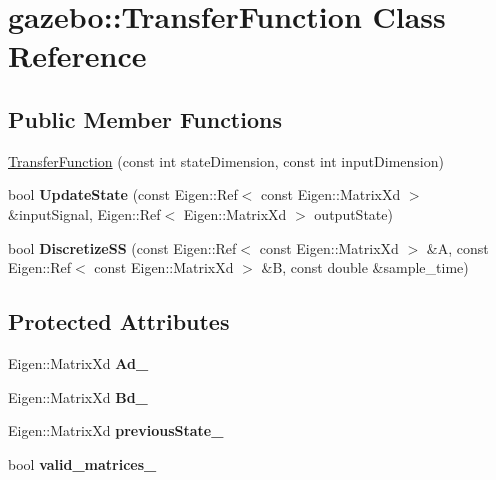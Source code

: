 \hypertarget{classgazebo_1_1_transfer_function}{\section{gazebo\-:\-:Transfer\-Function Class Reference}
\label{classgazebo_1_1_transfer_function}
}
\subsection*{Public Member Functions}
\begin{DoxyCompactItemize}
\item 
\hyperlink{classgazebo_1_1_transfer_function_a67927cfdcba964bb37d3ad76459a1837}{Transfer\-Function} (const int state\-Dimension, const int input\-Dimension)
\item 
\hypertarget{classgazebo_1_1_transfer_function_ab12052474f591bef9cb4452feeee6a90}{bool {\bfseries Update\-State} (const Eigen\-::\-Ref$<$ const Eigen\-::\-Matrix\-Xd $>$ \&input\-Signal, Eigen\-::\-Ref$<$ Eigen\-::\-Matrix\-Xd $>$ output\-State)}\label{classgazebo_1_1_transfer_function_ab12052474f591bef9cb4452feeee6a90}

\item 
\hypertarget{classgazebo_1_1_transfer_function_ae12d7e863cd3eaff1113ccd86f1981f8}{bool {\bfseries Discretize\-S\-S} (const Eigen\-::\-Ref$<$ const Eigen\-::\-Matrix\-Xd $>$ \&A, const Eigen\-::\-Ref$<$ const Eigen\-::\-Matrix\-Xd $>$ \&B, const double \&sample\-\_\-time)}\label{classgazebo_1_1_transfer_function_ae12d7e863cd3eaff1113ccd86f1981f8}

\end{DoxyCompactItemize}
\subsection*{Protected Attributes}
\begin{DoxyCompactItemize}
\item 
\hypertarget{classgazebo_1_1_transfer_function_af2b582071e209a501fe7827e9f9800e8}{Eigen\-::\-Matrix\-Xd {\bfseries Ad\-\_\-}}\label{classgazebo_1_1_transfer_function_af2b582071e209a501fe7827e9f9800e8}

\item 
\hypertarget{classgazebo_1_1_transfer_function_a7a987cb128df13733a0e596c4ebcbf2a}{Eigen\-::\-Matrix\-Xd {\bfseries Bd\-\_\-}}\label{classgazebo_1_1_transfer_function_a7a987cb128df13733a0e596c4ebcbf2a}

\item 
\hypertarget{classgazebo_1_1_transfer_function_a50112808200217a1df7d23a8998a20c6}{Eigen\-::\-Matrix\-Xd {\bfseries previous\-State\-\_\-}}\label{classgazebo_1_1_transfer_function_a50112808200217a1df7d23a8998a20c6}

\item 
\hypertarget{classgazebo_1_1_transfer_function_a274c05843951a83d3af3c02740981db6}{bool {\bfseries valid\-\_\-matrices\-\_\-}}\label{classgazebo_1_1_transfer_function_a274c05843951a83d3af3c02740981db6}

\end{DoxyCompactItemize}


